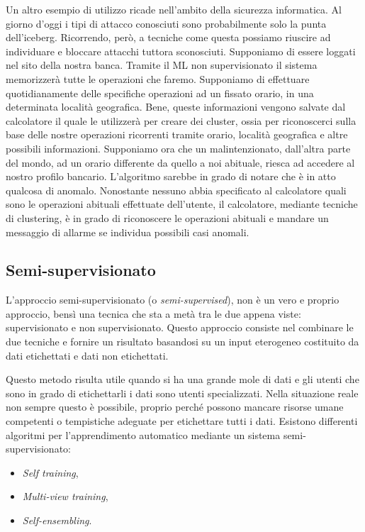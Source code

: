 \documentclass[12pt,italian]{report}
\begin{document}
Un altro esempio di utilizzo ricade nell'ambito della sicurezza informatica. Al giorno d'oggi i tipi di attacco conosciuti sono probabilmente solo la punta dell'iceberg. Ricorrendo, però, a tecniche come questa possiamo riuscire ad individuare e bloccare attacchi tuttora sconosciuti. 
Supponiamo di essere loggati nel sito della nostra banca. Tramite il ML non supervisionato il sistema memorizzerà tutte le operazioni che faremo. Supponiamo di effettuare quotidianamente delle specifiche operazioni ad un fissato orario, in una determinata località geografica. Bene, queste informazioni vengono salvate dal calcolatore il quale le utilizzerà per creare dei cluster, ossia per riconoscerci sulla base delle nostre operazioni ricorrenti tramite orario, località geografica e altre possibili informazioni. Supponiamo ora che un malintenzionato, dall'altra parte del mondo, ad un orario differente da quello a noi abituale, riesca ad accedere al nostro profilo bancario. L'algoritmo sarebbe in grado di notare che è in atto qualcosa di anomalo. Nonostante nessuno abbia specificato al calcolatore quali sono le operazioni abituali effettuate dell'utente, il calcolatore, mediante tecniche di clustering, è in grado di riconoscere le operazioni abituali e mandare un messaggio di allarme se individua possibili casi anomali. 

\subsection{Semi-supervisionato}

L'approccio semi-supervisionato (o \emph{semi-supervised}), non è un vero e proprio approccio, bensì una tecnica che sta a metà tra le due appena viste: supervisionato e non supervisionato. Questo approccio consiste nel combinare le due tecniche e fornire un risultato basandosi su un input eterogeneo costituito da dati etichettati e dati non etichettati.

Questo metodo risulta utile quando si ha una grande mole di dati e gli utenti che sono in grado di etichettarli i dati sono utenti specializzati. Nella situazione reale non sempre questo è possibile, proprio perché possono mancare risorse umane competenti o tempistiche adeguate per etichettare tutti i dati. Esistono differenti algoritmi per l'apprendimento automatico mediante un sistema semi-supervisionato:
\begin{itemize}
	\item \emph{Self training},
	\item \emph{Multi-view training},
	\item \emph{Self-ensembling}.
\end{itemize}
\end{document}
